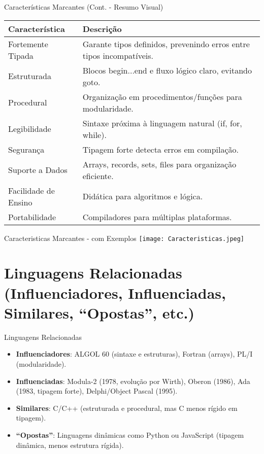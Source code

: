 \documentclass{beamer}
\begin{document}
\begin{frame}{Características Marcantes (Cont. - Resumo Visual)}
\begin{table}
\footnotesize %
\begin{tabular}{p{3cm}p{6cm}}
\toprule
\textbf{Característica} & \textbf{Descrição} \\
\midrule
Fortemente Tipada & Garante tipos definidos, prevenindo erros entre tipos incompatíveis. \\
Estruturada & Blocos begin...end e fluxo lógico claro, evitando goto. \\
Procedural & Organização em procedimentos/funções para modularidade. \\
Legibilidade & Sintaxe próxima à linguagem natural (if, for, while). \\
Segurança & Tipagem forte detecta erros em compilação. \\
Suporte a Dados & Arrays, records, sets, files para organização eficiente. \\
Facilidade de Ensino & Didática para algoritmos e lógica. \\
Portabilidade & Compiladores para múltiplas plataformas. \\
\bottomrule
\end{tabular}
\end{table}
\end{frame}

\begin{frame}{Caracteristicas Marcantes - com Exemplos}
    \centering
    \texttt{[image: Caracteristicas.jpeg]}
\end{frame}

\section{Linguagens Relacionadas (Influenciadores, Influenciadas, Similares, “Opostas”, etc.)}
\begin{frame}{Linguagens Relacionadas}
\begin{itemize}
\item \textbf{Influenciadores}: ALGOL 60 (sintaxe e estruturas), Fortran (arrays), PL/I (modularidade).
\item \textbf{Influenciadas}: Modula-2 (1978, evolução por Wirth), Oberon (1986), Ada (1983, tipagem forte), Delphi/Object Pascal (1995).
\item \textbf{Similares}: C/C++ (estruturada e procedural, mas C menos rígido em tipagem).
\item \textbf{“Opostas”}: Linguagens dinâmicas como Python ou JavaScript (tipagem dinâmica, menos estrutura rígida).
\end{itemize}
\end{frame}
\end{document}
